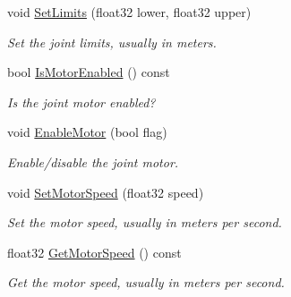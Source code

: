 \begin{DoxyCompactItemize}
\mbox{\label{classb2PrismaticJoint_a82a220e6d5a212c1924882e0855b0bef}} 
void \mbox{\hyperlink{classb2PrismaticJoint_a82a220e6d5a212c1924882e0855b0bef}{Set\+Limits}} (float32 lower, float32 upper)
\begin{DoxyCompactList}\small\item\em Set the joint limits, usually in meters. \end{DoxyCompactList}\item 
\mbox{\label{classb2PrismaticJoint_a06492dabf33439efdebceb29899c7fc9}} 
bool \mbox{\hyperlink{classb2PrismaticJoint_a06492dabf33439efdebceb29899c7fc9}{Is\+Motor\+Enabled}} () const
\begin{DoxyCompactList}\small\item\em Is the joint motor enabled? \end{DoxyCompactList}\item 
\mbox{\label{classb2PrismaticJoint_a4a7fd079de49f7ed5aa4a5d8d90be2a2}} 
void \mbox{\hyperlink{classb2PrismaticJoint_a4a7fd079de49f7ed5aa4a5d8d90be2a2}{Enable\+Motor}} (bool flag)
\begin{DoxyCompactList}\small\item\em Enable/disable the joint motor. \end{DoxyCompactList}\item 
\mbox{\label{classb2PrismaticJoint_a602ef7a6ca4fca55d011f1b38ab5a6c3}} 
void \mbox{\hyperlink{classb2PrismaticJoint_a602ef7a6ca4fca55d011f1b38ab5a6c3}{Set\+Motor\+Speed}} (float32 speed)
\begin{DoxyCompactList}\small\item\em Set the motor speed, usually in meters per second. \end{DoxyCompactList}\item 
\mbox{\label{classb2PrismaticJoint_a869c6edeb62ed01237b2adb09da273ae}} 
float32 \mbox{\hyperlink{classb2PrismaticJoint_a869c6edeb62ed01237b2adb09da273ae}{Get\+Motor\+Speed}} () const
\begin{DoxyCompactList}\small\item\em Get the motor speed, usually in meters per second. \end{DoxyCompactList}\item 

\end{DoxyCompactItemize}
